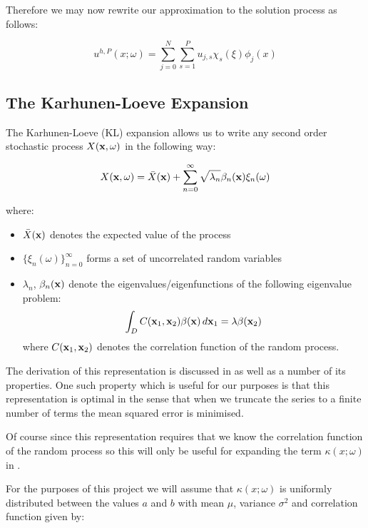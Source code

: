 Therefore we may now rewrite our approximation to the solution process
 as follows:

\begin{equation}\label{eq:oned-stochastic-uhp}
    u^{h,P}(x;\omega) = \sum_{j=0}^N\sum_{s=1}^Pu_{j,s}\chi_s(\xi)\phi_j(x)
\end{equation}

\subsection{The Karhunen-Loeve Expansion}\label{sec:oned-stochastic-kl-expansion}

The Karhunen-Loeve (KL) expansion allows us to write any second order
stochastic process $X(\mathbf{x},\omega)$ in the following way:

\begin{equation}
    X(\mathbf{x}, \omega) = \bar{X}(\mathbf{x})
    + \sum_{n = 0}^\infty\sqrt{\lambda_n}\beta_n(\mathbf{x})\xi_n(\omega)
\end{equation}

where:

\begin{itemize}
    \item $\bar{X}(\mathbf{x})$ denotes the expected value of the process
    \item $\{\xi_n(\omega)\}_{n=0}^\infty$ forms a set of uncorrelated random
          variables
    \item $\lambda_n$, $\beta_n(\mathbf{x})$ denote the eigenvalues/eigenfunctions
          of the following eigenvalue problem:
          \[
                \int_DC(\mathbf{x}_1, \mathbf{x}_2)\beta(\mathbf{x})\, d\mathbf{x}_1
                = \lambda\beta(\mathbf{x}_2)
          \]
          where $C(\mathbf{x}_1,\mathbf{x}_2)$ denotes the correlation function of the
          random process.
\end{itemize}

The derivation of this representation is discussed in \cite{stochastic-fem} as
well as a number of its properties. One such property which is useful for our
purposes is that this representation is optimal in the sense that when we
truncate the series to a finite number of terms the mean squared error is
minimised.

Of course since this representation requires that we know the correlation
function of the random process so this will only be useful for expanding the
term $\kappa(x;\omega)$ in .

For the purposes of this project we will assume that $\kappa(x;\omega)$ is
uniformly distributed between the values $a$ and $b$ with mean $\mu$,
variance $\sigma^2$ and correlation function given by:

